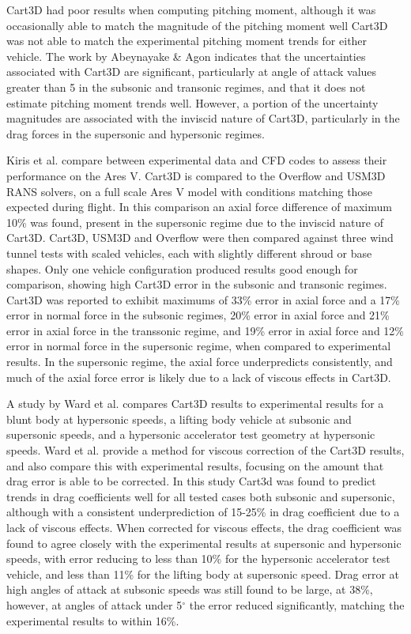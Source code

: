Cart3D had poor results when computing pitching moment, although it was occasionally able to match the magnitude of the pitching moment well Cart3D was not able to match the experimental pitching moment trends for either vehicle\cite{Abeynayake2013a}. The work by Abeynayake \& Agon indicates that the uncertainties associated with Cart3D are significant, particularly at angle of attack values greater than 5 in the subsonic and transonic regimes, and that it does not estimate pitching moment trends well. However, a portion of the uncertainty magnitudes are associated with the inviscid nature of Cart3D, particularly in the drag forces in the supersonic and hypersonic regimes.

Kiris et al. compare between experimental data and CFD codes to assess their performance on the Ares V\cite{Kiris2011}. Cart3D is compared to the Overflow and USM3D RANS solvers, on a full scale Ares V model with conditions matching those expected during flight. In this comparison an axial force difference of maximum 10\% was found, present in the supersonic regime due to the inviscid nature of Cart3D\cite{Kiris2011}. Cart3D, USM3D and Overflow were then compared against three wind tunnel tests with scaled vehicles, each with slightly different shroud or base shapes. Only one vehicle configuration produced results good enough for comparison\cite{Kiris2011}, showing high Cart3D error in the subsonic and transonic regimes. Cart3D was reported to exhibit maximums of 33\% error in axial force and a 17\% error in normal force in the subsonic regimes, 20\% error in axial force and 21\% error in axial force in the transsonic regime, and 19\% error in axial force and 12\% error in normal force in the supersonic regime, when compared to experimental results. In the supersonic regime, the axial force underpredicts consistently, and much of the axial force error is likely due to a lack of viscous effects in Cart3D. 

A study by Ward et al.\cite{Ward2018} compares Cart3D results to experimental results for a blunt body at hypersonic speeds, a lifting body vehicle at subsonic and supersonic speeds, and a hypersonic accelerator test geometry at hypersonic speeds. Ward et al. provide a method for viscous correction of the Cart3D results, and also compare this with experimental results, focusing on the amount that drag error is able to be corrected. In this study Cart3d was found to predict trends in drag coefficients well for all tested cases both subsonic and supersonic, although with a consistent underprediction of 15-25\% in drag coefficient due to a lack of viscous effects\cite{Ward2018}. When corrected for viscous effects, the drag coefficient was found to agree closely with the experimental results at supersonic and hypersonic speeds, with error reducing to less than 10\% for the hypersonic accelerator test vehicle, and less than 11\% for the lifting body at supersonic speed\cite{Ward2018}. Drag error at high angles of attack at subsonic speeds was still found to be large, at 38\%, however, at angles of attack under 5$^\circ$ the error reduced significantly, matching the experimental results to within 16\%. 


